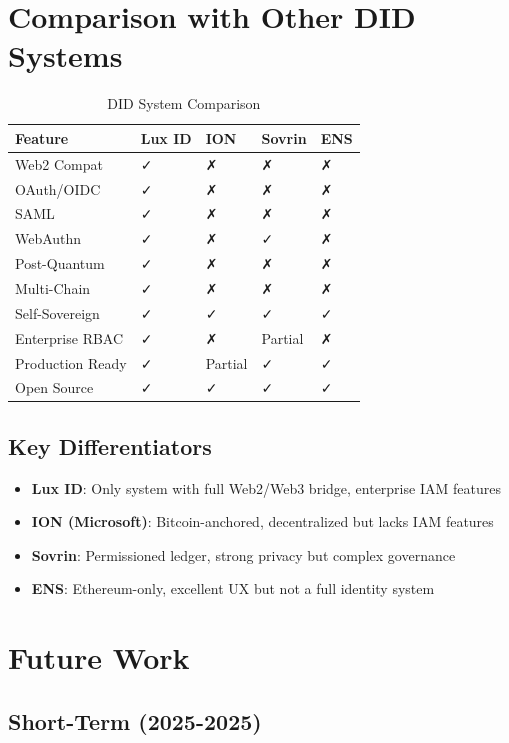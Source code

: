 \documentclass[11pt,a4paper]{article}
\begin{document}
\section{Comparison with Other DID Systems}

\begin{table}[h]
\centering
\small
\begin{tabular}{@{}p{2.5cm}p{1.5cm}p{1.5cm}p{1.5cm}p{1.5cm}@{}}
\toprule
\textbf{Feature} & \textbf{Lux ID} & \textbf{ION} & \textbf{Sovrin} & \textbf{ENS} \\ \midrule
Web2 Compat & ✓ & ✗ & ✗ & ✗ \\
OAuth/OIDC & ✓ & ✗ & ✗ & ✗ \\
SAML & ✓ & ✗ & ✗ & ✗ \\
WebAuthn & ✓ & ✗ & ✓ & ✗ \\
Post-Quantum & ✓ & ✗ & ✗ & ✗ \\
Multi-Chain & ✓ & ✗ & ✗ & ✗ \\
Self-Sovereign & ✓ & ✓ & ✓ & ✓ \\
Enterprise RBAC & ✓ & ✗ & Partial & ✗ \\
Production Ready & ✓ & Partial & ✓ & ✓ \\
Open Source & ✓ & ✓ & ✓ & ✓ \\ \bottomrule
\end{tabular}
\caption{DID System Comparison}
\end{table}

\subsection{Key Differentiators}

\begin{itemize}
  \item \textbf{Lux ID}: Only system with full Web2/Web3 bridge, enterprise IAM features
  \item \textbf{ION (Microsoft)}: Bitcoin-anchored, decentralized but lacks IAM features
  \item \textbf{Sovrin}: Permissioned ledger, strong privacy but complex governance
  \item \textbf{ENS}: Ethereum-only, excellent UX but not a full identity system
\end{itemize}

\section{Future Work}

\subsection{Short-Term (2025-2025)}
\end{document}
